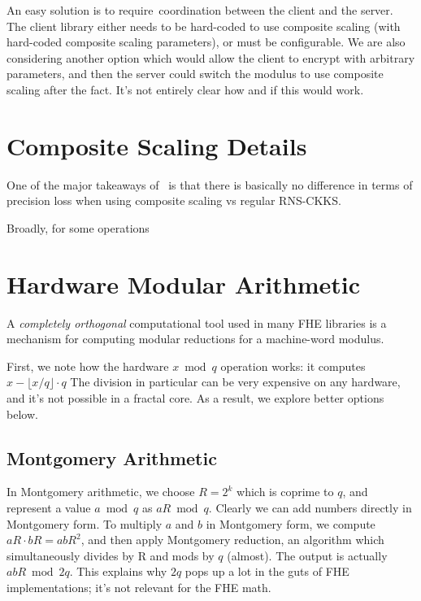 \documentclass{article}
\begin{document}
	An easy solution is to require coordination between the client and the server. The client library either needs to be hard-coded to use composite scaling (with hard-coded composite scaling parameters), or must be configurable. We are also considering another option which would allow the client to encrypt with arbitrary parameters, and then the server could switch the modulus to use composite scaling after the fact. It's not entirely clear how and if this would work.
	
\section{Composite Scaling Details}
One of the major takeaways of~\cite{cryptoeprint:2023/1462} is that there is basically no difference in terms of precision loss when using composite scaling vs regular RNS-CKKS.

Broadly, for some operations 

\section{Hardware Modular Arithmetic}
A \emph{completely orthogonal} computational tool used in many FHE libraries is a mechanism for computing modular reductions for a machine-word modulus.

First, we note how the hardware $x\bmod q$ operation works: it computes $x-\lfloor x/q\rfloor\cdot q$ The division in particular can be very expensive on any hardware, and it's not possible in a fractal core. As a result, we explore better options below.

\subsection{Montgomery Arithmetic}
In Montgomery arithmetic, we choose $R=2^k$ which is coprime to $q$, and represent a value $a \bmod q$ as $aR\bmod q$. Clearly we can add numbers directly in Montgomery form. To multiply $a$ and $b$ in Montgomery form, we compute $aR\cdot bR=abR^2$, and then apply Montgomery reduction, an algorithm which simultaneously divides by R and mods by $q$ (almost). The output is actually $abR\bmod 2q$. This explains why $2q$ pops up a lot in the guts of FHE implementations; it's not relevant for the FHE math.

	
\printbibliography 
\end{document}
